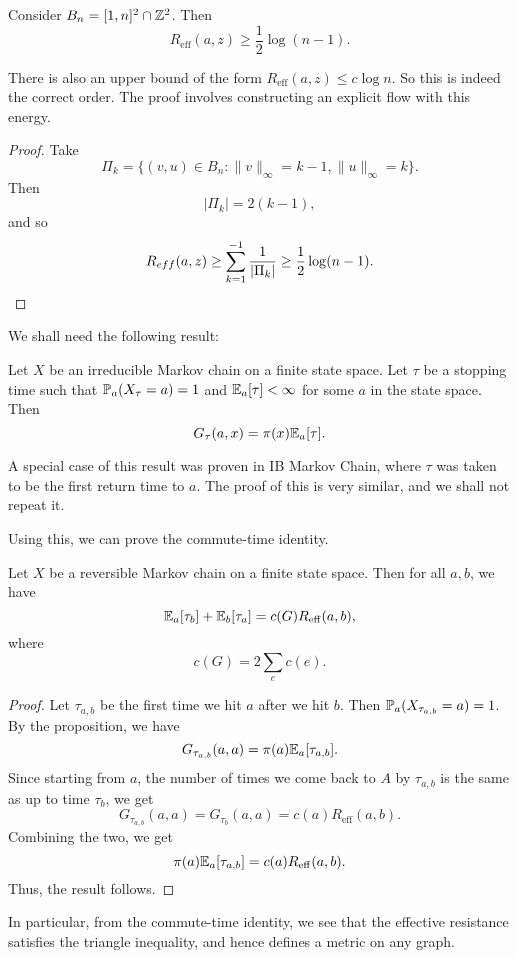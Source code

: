 \documentclass[a4paper]{article}
\begin{document}
\begin{cor}
  Consider $B_n = [1, n]^2 \cap \Z^2$. Then
  \[
    R_{\mathrm{eff}}(a, z) \geq \frac{1}{2} \log (n - 1).
  \]
\end{cor}
There is also an upper bound of the form $R_{\mathrm{eff}}(a, z) \leq c \log n$. So this is indeed the correct order. The proof involves constructing an explicit flow with this energy.

\begin{proof}
  Take
  \[
    \Pi_k = \{(v, u) \in B_n: \|v\|_\infty = k - 1, \|u\|_\infty = k\}.
  \]
  Then
  \[
    |\Pi_k| = 2(k - 1),
  \]
  and so
  \[
    R_{eff}(a, z) \geq \sum_{k = 1}^{ - 1} \frac{1}{|\Pi_k|} \geq \frac{1}{2} \log (n - 1).\qedhere
  \]
\end{proof}

We shall need the following result:
\begin{prop}
  Let $X$ be an irreducible Markov chain on a finite state space. Let $\tau$ be a stopping time such that $\P_a(X_\tau = a) = 1$ and $\E_a[\tau] < \infty$ for some $a$ in the state space. Then
  \[
    G_\tau(a, x) = \pi(x) \E_a[\tau].
  \]
\end{prop}
A special case of this result was proven in IB Markov Chain, where $\tau$ was taken to be the first return time to $a$. The proof of this is very similar, and we shall not repeat it.

Using this, we can prove the commute-time identity.
\begin{thm}
  Let $X$ be a reversible Markov chain on a finite state space. Then for all $a, b$, we have
  \[
    \E_a [\tau_b] + \E_b[ \tau_a] = c(G) R_{\mathrm{eff}}(a, b),
  \]
  where
  \[
    c(G) = 2 \sum_e c(e).
  \]
\end{thm}

\begin{proof}
  Let $\tau_{a,b}$ be the first time we hit $a$ after we hit $b$. Then $\P_a(X_{\tau_{a, b}} = a) = 1$. By the proposition, we have
  \[
    G_{\tau_{a, b}}(a, a) = \pi(a) \E_a[\tau_{a,b}].
  \]
  Since starting from $a$, the number of times we come back to $A$ by $\tau_{a, b}$ is the same as up to time $\tau_b$, we get
  \[
    G_{\tau_{a,b}}(a, a) = G_{\tau_b}(a, a) = c(a) R_{\mathrm{eff}}(a, b).
  \]
  Combining the two, we get
  \[
    \pi(a) \E_a[\tau_{a, b}] = c(a) R_{\mathrm{eff}}(a, b).
  \]
  Thus, the result follows.
\end{proof}
In particular, from the commute-time identity, we see that the effective resistance satisfies the triangle inequality, and hence defines a metric on any graph.
\end{document}
